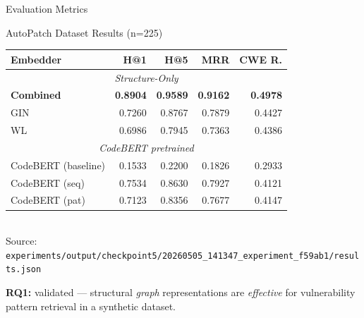 \documentclass[aspectratio=169,10pt]{beamer}
\begin{document}
\begin{frame}[fragile]{Evaluation Metrics}
\begin{center}
  \end{center}
 

\end{frame}
\begin{frame}{ AutoPatch Dataset Results (n=225)}

  \vspace{0.3cm}
  \begin{table}
    \centering
    \small
    \begin{tabular}{lrrrr}
      \toprule
      \textbf{Embedder} & \textbf{H@1} & \textbf{H@5} & \textbf{MRR} & \textbf{CWE R.} \\
      \midrule
      \multicolumn{5}{c}{\textit{Structure-Only}} \\
      \midrule
      \textbf{Combined} & \textbf{0.8904} & \textbf{0.9589} & \textbf{0.9162} & \textbf{0.4978} \\
      GIN & 0.7260 & 0.8767 & 0.7879 & 0.4427 \\
      WL & 0.6986 & 0.7945 & 0.7363 & 0.4386 \\
      \midrule
      \multicolumn{5}{c}{\textit{CodeBERT pretrained}} \\
      \midrule
      CodeBERT (baseline) & 0.1533 & 0.2200 & 0.1826 & 0.2933 \\
      CodeBERT (seq) & 0.7534 & 0.8630 & 0.7927 & 0.4121 \\
CodeBERT (pat) & 0.7123 & 0.8356 & 0.7677 & 0.4147 \\      \bottomrule
    \end{tabular}
    \\[2pt]
    {\tiny\textcolor{notecol}{Source: \texttt{experiments/output/checkpoint5/20260505\_141347\_experiment\_f59ab1/results.json}}}
  \end{table}

  
  \textbf{RQ1:} validated — structural \textit{graph} representations are \textit{effective} for vulnerability pattern retrieval in a synthetic dataset.
\end{frame}
\end{document}
